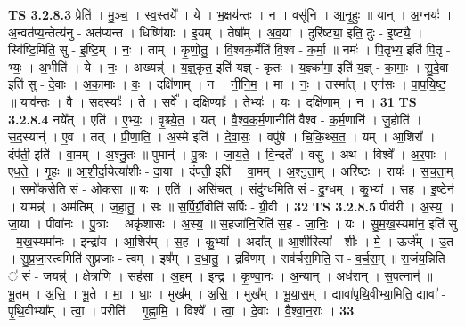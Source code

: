 \documentclass[17pt]{extarticle}
\begin{document}
                  \newline
                                \textbf{ TS 3.2.8.3} \newline
                  प्रेति॑ । मु॒ञ्च॒ । स्व॒स्तये᳚ । ये । भ॒क्षय॑न्तः । न । वसू॑नि । आ॒नृ॒हुः ॥ यान् । अ॒ग्नयः॑ । अ॒न्वत॑प्य॒न्तेत्य॑नु - अत॑प्यन्त । धिष्णि॑याः । इ॒यम् । तेषा᳚म् । अ॒व॒या । दुरि॑ष्ट्या॒ इति॒ दुः - इ॒ष्ट्यै॒ । स्वि॑ष्टि॒मिति॒ सु - इ॒ष्टि॒म् । नः॒ । ताम् । कृ॒णो॒तु॒ । वि॒श्वक॒र्मेति॑ वि॒श्व - क॒र्मा॒ ॥ नमः॑ । पि॒तृभ्य॒ इति॑ पि॒तृ - भ्यः॒ । अ॒भीति॑ । ये । नः॒ । अख्यन्न्॑ । य॒ज्ञ्॒कृत॒ इति॑ यज्ञ् - कृतः॑ । य॒ज्ञ्का॑मा॒ इति॑ य॒ज्ञ् - का॒माः॒ । सु॒दे॒वा इति॑ सु - दे॒वाः । अ॒का॒माः । वः॒ । दक्षि॑णाम् । न । नी॒नि॒म॒ । मा । नः॒ । तस्मा᳚त् । एन॑सः । पा॒प॒यि॒ष्ट॒ ॥ याव॑न्तः । वै । स॒द॒स्याः᳚ । ते । सर्वे᳚ । द॒क्षि॒ण्याः᳚ । तेभ्यः॑ । यः । दक्षि॑णाम् । न । \textbf{  31} \newline
                  \newline
                                \textbf{ TS 3.2.8.4} \newline
                  नये᳚त् । एति॑ । ए॒भ्यः॒ । वृ॒श्च्ये॒त॒ । यत् । वै॒श्व॒क॒र्म॒णानीति॑ वैश्व - क॒र्म॒णानि॑ । जु॒होति॑ । स॒द॒स्यान्॑ । ए॒व । तत् । प्री॒णा॒ति॒ । अ॒स्मे इति॑ । दे॒वा॒सः॒ । वपु॑षे । चि॒कि॒थ्स॒त॒ । यम् । आ॒शिरा᳚ । दंप॑ती॒ इति॑ । वा॒मम् । अ॒श्नु॒तः ॥ पुमान्॑ । पु॒त्रः । जा॒य॒ते॒ । वि॒न्दते᳚ । वसु॑ । अथ॑ । विश्वे᳚ । अ॒र॒पाः । ए॒ध॒ते॒ । गृ॒हः ॥ आ॒शी॒र्दा॒येत्या॑शीः - दा॒या । दंप॑ती॒ इति॑ । वा॒मम् । अ॒श्नु॒ता॒म् । अरि॑ष्टः । रायः॑ । स॒च॒ता॒म् । समो॑क॒सेति॒ सं - ओ॒क॒सा॒ ॥ यः । एति॑ । असि॑चत् । संदु॑ग्ध॒मिति॒ सं - दु॒ग्ध॒म् । कु॒भ्यां । स॒ह । इ॒ष्टेन॑ । यामन्न्॑ । अम॑तिम् । ज॒हा॒तु॒ । सः ॥ स॒र्पि॒र्ग्री॒वीति॑ सर्पिः - ग्री॒वी । \textbf{  32} \newline
                  \newline
                                \textbf{ TS 3.2.8.5} \newline
                  पीव॑री । अ॒स्य॒ । जा॒या । पीवा॑नः । पु॒त्राः । अकृ॑शासः । अ॒स्य॒ ॥ स॒हजा॑नि॒रिति॑ स॒ह - जा॒निः॒ । यः । सु॒म॒ख॒स्यमा॑न॒ इति॑ सु - म॒ख॒स्यमा॑नः । इन्द्रा॑य । आ॒शिर᳚म् । स॒ह । कु॒भ्यां । अदा᳚त् ॥ आ॒शीरित्या᳚ - शीः । मे॒ । ऊर्ज᳚म् । उ॒त । सु॒प्र॒जा॒स्त्वमिति॑ सुप्रजाः - त्वम् । इष᳚म् । द॒धा॒तु॒ । द्रवि॑णम् । सव॑र्चस॒मिति॒ स - व॒र्च॒स॒म् ॥ स॒जंय॒न्निति ॑ सं - जयन्न्॑ । क्षेत्रा॑णि । सह॑सा । अ॒हम् । इ॒न्द्र॒ । कृ॒ण्वा॒नः । अ॒न्यान् । अध॑रान् । स॒पत्नान्॑ ॥ भू॒तम् । अ॒सि॒ । भू॒ते । मा॒ । धाः॒ । मुख᳚म् । अ॒सि॒ । मुख᳚म् । भू॒या॒स॒म् । द्यावा॑पृथि॒वीभ्या॒मिति॒ द्यावा᳚ - पृ॒थि॒वीभ्या᳚म् । त्वा॒ । परीति॑ । गृ॒ह्णा॒मि॒ । विश्वे᳚ । त्वा॒ । दे॒वाः । वै॒श्वा॒न॒राः । \textbf{  33} \newline
\end{document}
